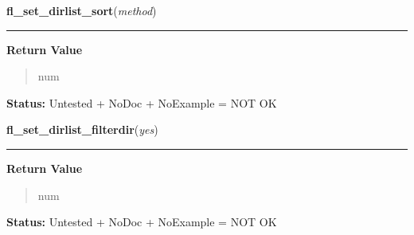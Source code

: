     \label{xformslib:library:fl_set_dirlist_sort}

    \vspace{0.5ex}

\hspace{.8\funcindent}\begin{boxedminipage}{\funcwidth}

    \raggedright \textbf{fl\_set\_dirlist\_sort}(\textit{method})

    \vspace{-1.5ex}

    \rule{\textwidth}{0.5\fboxrule}
\setlength{\parskip}{2ex}
\setlength{\parskip}{1ex}
      \textbf{Return Value}
    \vspace{-1ex}

      \begin{quote}
      num

      \end{quote}

\textbf{Status:} Untested + NoDoc + NoExample = NOT OK



    \end{boxedminipage}

    \label{xformslib:library:fl_set_dirlist_filterdir}

    \vspace{0.5ex}

\hspace{.8\funcindent}\begin{boxedminipage}{\funcwidth}

    \raggedright \textbf{fl\_set\_dirlist\_filterdir}(\textit{yes})

    \vspace{-1.5ex}

    \rule{\textwidth}{0.5\fboxrule}
\setlength{\parskip}{2ex}
\setlength{\parskip}{1ex}
      \textbf{Return Value}
    \vspace{-1ex}

      \begin{quote}
      num

      \end{quote}

\textbf{Status:} Untested + NoDoc + NoExample = NOT OK



    \end{boxedminipage}

